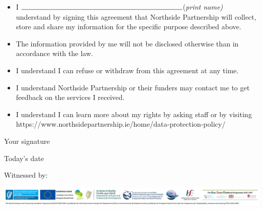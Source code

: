 \documentclass[a4paper,10pt]{article}
\begin{document}
\begin{small}
\begin{itemize}
    \item I $\rule{8cm}{0.15mm}$(\textit{print name) }understand by signing this agreement that Northside Partnership will collect, store and share my information for the specific purpose described above.
    \item The information provided by me will not be disclosed otherwise than in accordance with the law.
    \item I understand I can refuse or withdraw from this agreement at any time.
    \item I understand Northside Partnership or their funders may contact me to get feedback on the services I received.
    \item I understand I can learn more about my rights by asking staff or by visiting https://www.northsidepartnership.ie/home/data-protection-policy/ \\ 
\end{itemize}
\end{small}

\begin{minipage}{.37\textwidth}
\begin{mybox}{Your signature}
 \vspace*{0.3 cm}
\end{mybox}
\end{minipage}%
\begin{minipage}{.26\textwidth}
\begin{mybox}{Today's date}
 \vspace*{0.3 cm}
\end{mybox}
\end{minipage}%
\begin{minipage}{.37\textwidth}
\begin{mybox}{Witnessed by:}
 \vspace*{0.3 cm}
\end{mybox}
\end{minipage}%



\centering

{\includegraphics[scale = 0.061]{Footer_Banner.png}}
\end{document}
